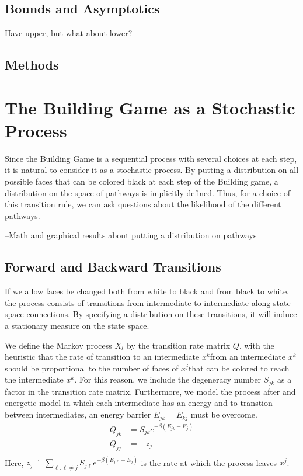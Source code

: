 \documentclass[12pt]{article}
\newcommand{\colorA}{white}
\newcommand{\colorB}{black}
\newcommand{\spc}{ }
\newcommand{\xj}{$x^j$}
\newcommand{\xk}{$x^k$}
\newcommand{\Sjk}{$S_{jk}$}
\begin{document}
\subsection{Bounds and Asymptotics}
Have upper, but what about lower? 
\subsection{Methods}
\section{The Building Game as a Stochastic Process}
\label{sec:Prob}
Since the Building Game is a sequential process with several choices at each step, it is natural to consider it as a stochastic process. By putting a distribution on all possible faces that can be colored \colorB\spc at each step of the Building game, a distribution on the space of pathways is implicitly defined. Thus, for a choice of this transition rule, we can ask questions about the likelihood of the different pathways. 

--Math and graphical results about putting a distribution on pathways

\subsection{Forward and Backward Transitions}

If we allow faces be changed both from \colorA\spc to \colorB\spc and from \colorB\spc to \colorA, the process consists of transitions from intermediate to intermediate along state space connections. By specifying a distribution on these transitions, it will induce a stationary measure on the state space.  

We define the Markov process $X_t$ by the transition rate matrix $Q$, with the heuristic that the rate of transition to an intermediate \xk from an intermediate \xk should be proportional to the number of faces of \xj that can be colored to reach the intermediate \xk. For this reason, we include the degeneracy number \Sjk\spc as a factor in the transition rate matrix. Furthermore, we model the process after and energetic model in which each intermediate has an energy and to transtion between intermediates, an energy barrier $E_{jk} = E_{kj}$ must be overcome. 
\begin{align}
\label{eq:TransitionRate}
Q_{jk} &= S_{jk}e^{-\beta\left(E_{jk} - E_j\right)} \\
Q_{jj} &= -z_j \\
\end{align}
Here, $z_j \doteq \sum_{\ell: \ell \neq j} S_{j\ell}e^{-\beta\left(E_{j\ell} - E_j\right)}$ is the rate at which the process leaves \xj. 
\end{document}
